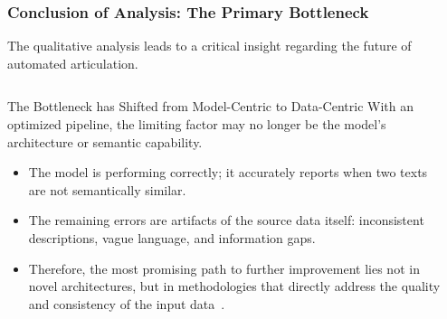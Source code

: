 \documentclass[aspectratio=169,10pt]{beamer}
\begin{document}
\begin{frame}

\end{frame}

\begin{frame}
    \frametitle{Conclusion of Analysis: The Primary Bottleneck}
    
    The qualitative analysis leads to a critical insight regarding the future of automated articulation.
    
    \begin{columns}[T]
        \begin{column}{0.6\textwidth}
            
            \begin{alertblock}{The Bottleneck has Shifted from Model-Centric to Data-Centric}
                With an optimized pipeline, the limiting factor may no longer be the model's architecture or semantic capability.
                \begin{itemize}
                    \item The model is performing correctly; it accurately reports when two texts are not semantically similar.
                    \item The remaining errors are artifacts of the source data itself: inconsistent descriptions, vague language, and information gaps.
                    \item Therefore, the most promising path to further improvement lies not in novel architectures, but in methodologies that directly address the quality and consistency of the input data~\cite{gauthier2022}.
                \end{itemize}
            \end{alertblock}
            
        \end{column}
        
        \begin{column}{0.35\textwidth}
            \hfill\vspace{4mm}
            

\end{column}
\end{columns}
\end{frame}
\end{document}
